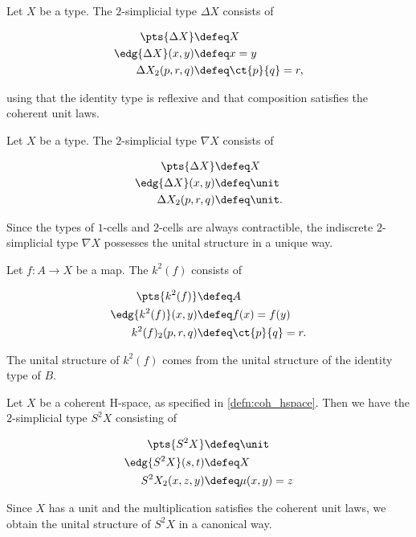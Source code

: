 \begin{eg}
Let $X$ be a type. The  $2$-simplicial type $\Delta X$ consists of
\begin{samepage}
\begin{align*}
\pts{\Delta X} & \defeq X \\
\edg{\Delta X}(x,y) & \defeq x=y \\
\Delta X_2(p,r,q) & \defeq \ct{p}{q}=r,
\end{align*}
\end{samepage}%
using that the identity type is reflexive and that composition satisfies the coherent unit laws. 
\end{eg}

\begin{eg}
Let $X$ be a type. The  $2$-simplicial type $\nabla X$ consists of
\begin{samepage}
\begin{align*}
\pts{\Delta X} & \defeq X \\
\edg{\Delta X}(x,y) & \defeq \unit \\
\Delta X_2(p,r,q) & \defeq \unit. \\
\end{align*}
\end{samepage}%
Since the types of $1$-cells and $2$-cells are always contractible, the indiscrete $2$-simplicial type $\nabla X$ possesses the unital structure in a unique way. 
\end{eg}

\begin{eg}
Let $f:A\to X$ be a map. The  $k^2(f)$ consists of
\begin{samepage}
\begin{align*}
\pts{k^2(f)} & \defeq A \\
\edg{k^2(f)}(x,y) & \defeq f(x)=f(y) \\
k^2(f)_2(p,r,q) & \defeq \ct{p}{q}=r. \\
\end{align*}
\end{samepage}%
The unital structure of $k^2(f)$ comes from the unital structure of the identity type of $B$.
\end{eg}

\begin{eg}
Let $X$ be a coherent H-space, as specified in \cref{defn:coh_hspace}. Then we have the $2$-simplicial type $S^2X$ consisting of
\begin{samepage}
\begin{align*}
\pts{S^2X} & \defeq \unit \\
\edg{S^2X}(s,t) & \defeq X \\
S^2X_2(x,z,y) & \defeq \mu(x,y)=z \\
\end{align*}
\end{samepage}%
Since $X$ has a unit and the multiplication satisfies the coherent unit laws, we obtain the unital structure of $S^2 X$ in a canonical way.
\end{eg}

